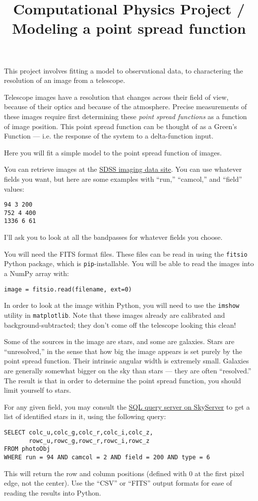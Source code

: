 \documentclass[11pt, preprint]{aastex}
\begin{document}
\title{\bf Computational Physics Project / Modeling a point spread
  function}

This project involves fitting a model to observational data, to
charactering the resolution of an image from a telescope.

Telescope images have a resolution that changes across their field of
view, because of their optics and because of the atmosphere.  Precise
measurements of these images require first determining these {\it
  point spread functions} as a function of image position. This point
spread function can be thought of as a Green's Function --- i.e. the
response of the system to a delta-function input.

Here you will fit a simple model to the point spread function of
images. 

You can retrieve images at the
\href{http://dr12.sdss.org/fields}{\color{blue} SDSS imaging data
  site}. You can use whatever fields you want, but here are some
examples with ``run,'' ``camcol,'' and ``field'' values:
\begin{verbatim}
94 3 200
752 4 400
1336 6 61
\end{verbatim}
I'll ask you to look at all the bandpasses for whatever fields you
choose.

You will need the FITS format files. These files can be read in using
the {\tt fitsio} Python package, which is {\tt pip}-installable. You
will be able to read the images into a NumPy array with:
\begin{verbatim}
image = fitsio.read(filename, ext=0)
\end{verbatim}
In order to look at the image within Python, you will need to use the
{\tt imshow} utility in {\tt matplotlib}.  Note that these images
already are calibrated and background-subtracted; they don't come off
the telescope looking this clean!

Some of the sources in the image are stars, and some are
galaxies. Stars are ``unresolved,'' in the sense that how big the
image appears is set purely by the point spread function. Their
intrinsic angular width is extremely small. Galaxies are generally
somewhat bigger on the sky than stars --- they are often ``resolved.''
The result is that in order to determine the point spread function,
you should limit yourself to stars. 

For any given field, you may consult the
\href{http://skyserver.sdss.org/dr14/en/tools/search/sql.aspx}{\color{blue}
  SQL query server on SkyServer} to get a list of identified stars in
it, using the following query:
\begin{verbatim}
SELECT colc_u,colc_g,colc_r,colc_i,colc_z,
       rowc_u,rowc_g,rowc_r,rowc_i,rowc_z
FROM photoObj
WHERE run = 94 AND camcol = 2 AND field = 200 AND type = 6
\end{verbatim}
This will return the row and column positions (defined with 0 at the
first pixel edge, not the center). Use the ``CSV'' or ``FITS'' output
formats for ease of reading the results into Python.
\end{document}
